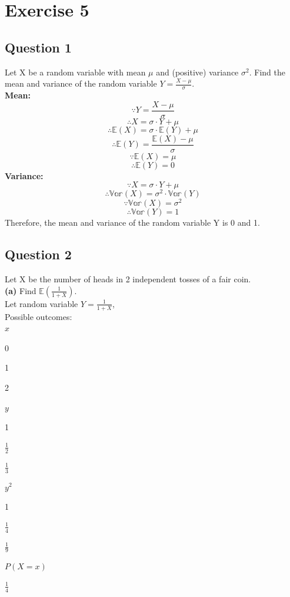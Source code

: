 \documentclass[
]{book}
\begin{document}
\chapter{Exercise 5}\label{exercise-5}

\section{Question 1}\label{question-1-3}

Let X be a random variable with mean \(\mu\) and (positive) variance \(\sigma^2\). Find the mean and variance of the random variable \(Y = \frac{X - \mu}{\sigma}\).\\
\textbf{Mean:}
\[\because Y = \frac{X - \mu}{\sigma}\]
\[\therefore X = \sigma \cdot Y + \mu\]
\[\therefore \mathbb{E}(X) = \sigma \cdot \mathbb{E}(Y) + \mu\]
\[\therefore \mathbb{E}(Y) = \frac{\mathbb{E}(X) - \mu}{\sigma}\]
\[\because \mathbb{E}(X) = \mu\]
\[\therefore \mathbb{E}(Y) = 0\]
\textbf{Variance:}
\[\because X = \sigma \cdot Y + \mu\]
\[\therefore \mathbb{Var}(X) = \sigma^2 \cdot \mathbb{Var}(Y)\]
\[\because \mathbb{Var}(X) = \sigma^2\]
\[\therefore \mathbb{Var}(Y) = 1\]
Therefore, the mean and variance of the random variable Y is 0 and 1.

\section{Question 2}\label{question-2-3}

Let X be the number of heads in 2 independent tosses of a fair coin.\\
\textbf{(a)} Find \(\mathbb{E}(\frac{1}{1+X})\).\\
Let random variable \(Y = \frac{1}{1+X}\),\\
Possible outcomes:\\

\(x\)

0

1

2

\(y\)

1

\(\frac{1}{2}\)

\(\frac{1}{3}\)

\(y^2\)

1

\(\frac{1}{4}\)

\(\frac{1}{9}\)

\(P(X=x)\)

\(\frac{1}{4}\)
\end{document}
